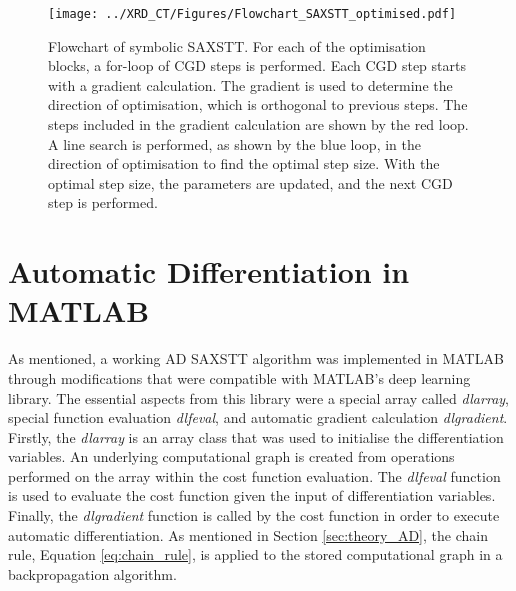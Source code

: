 \begin{figure}
    \centering
    \texttt{[image: ../XRD\_CT/Figures/Flowchart\_SAXSTT\_optimised.pdf]} %
    \caption[Flowchart of Symbolic SAXSTT]{Flowchart of symbolic SAXSTT.
        For each of the optimisation blocks, a for-loop of CGD steps is performed.
        Each CGD step starts with a gradient calculation.
        The gradient is used to determine the direction of optimisation, which is orthogonal to previous steps.
        The steps included in the gradient calculation are shown by the red loop.
        A line search is performed, as shown by the blue loop, in the direction of optimisation to find the optimal step size.
        With the optimal step size, the parameters are updated, and the next CGD step is performed.
    }
    \label{fig:flowchart_SAXSTT}
\end{figure}

\section{Automatic Differentiation in MATLAB}%
\label{sec:AD_matlab}
As mentioned,
a working AD SAXSTT algorithm was implemented  in MATLAB
through modifications that were compatible with MATLAB's deep learning library.
The essential aspects from this library were a special array called \emph{dlarray}, special function evaluation \emph{dlfeval}, and automatic gradient calculation \emph{dlgradient}.
Firstly, the \emph{dlarray} is an array class that was used to initialise the differentiation variables.
An underlying computational graph is created from operations performed on the array within the cost function evaluation.
The \emph{dlfeval} function is used to evaluate the cost function given the input of differentiation variables.
Finally, the \emph{dlgradient} function is called by the cost function in order to execute automatic differentiation.
As mentioned in Section \ref{sec:theory_AD}, the chain rule, Equation \eqref{eq:chain_rule}, is applied to the stored computational graph in a backpropagation algorithm.


